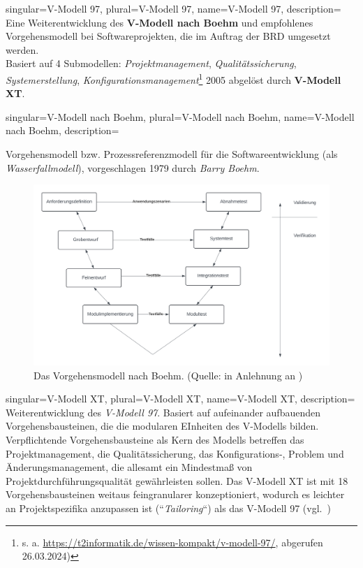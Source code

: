 
{
    singular={V-Modell 97},
    plural={V-Modell 97},
    name={V-Modell 97},
    description={
        Eine Weiterentwicklung des \textbf{V-Modell nach Boehm} und empfohlenes Vorgehensmodell bei Softwareprojekten, die im Auftrag der BRD umgesetzt werden.\\
        Basiert auf 4 Submodellen: \textit{Projektmanagement}, \textit{Qualitätssicherung}, \textit{Systemerstellung}, \textit{Konfigurationsmanagement}\footnote{s. a. \url{https://t2informatik.de/wissen-kompakt/v-modell-97/}, abgerufen 26.03.2024)}
        2005 abgelöst durch \textbf{V-Modell XT}.
    }
}

{
    singular={V-Modell nach Boehm},
    plural={V-Modell nach Boehm},
    name={V-Modell nach Boehm},
    description={
        Vorgehensmodell bzw. Prozessreferenzmodell für die Softwareentwicklung (als \textit{Wasserfallmodell}), vorgeschlagen 1979 durch \textit{Barry Boehm}.
        \begin{figure}
            \centering
            \includegraphics[scale=0.3]{chapters/Glossar/img/vmodell}
            \caption{Das Vorgehensmodell nach Boehm. (Quelle: in Anlehnung an \cite[554, Abb. 20.11-2]{Bal08})}
        \end{figure}
    }
}

{
    singular={V-Modell XT},
    plural={V-Modell XT},
    name={V-Modell XT},
    description={
        Weiterentwicklung des \textit{V-Modell 97}. Basiert auf aufeinander
        aufbauenden Vorgehensbausteinen, die die modularen EInheiten des
        V-Modells bilden. Verpflichtende Vorgehensbausteine als Kern des Modells
        betreffen das Projektmanagement, die Qualitätssicherung, das Konfigurations-,
        Problem und Änderungsmanagement, die allesamt ein Mindestmaß von Projektdurchführungsqualität
        gewährleisten sollen. Das V-Modell XT ist mit 18 Vorgehensbausteinen
        weitaus feingranularer konzeptioniert, wodurch es leichter an Projektspezifika
        anzupassen ist (``\textit{Tailoring}``) als das V-Modell 97 (vgl.~\cite[329 f.]{AABG14n})
    }
}

